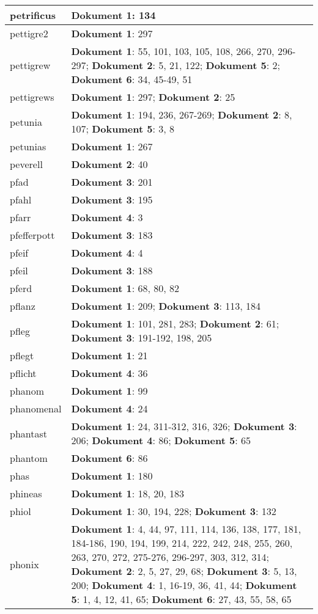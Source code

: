 \documentclass[a5paper]{article}
\begin{document}
\begin{longtable}[l]{|l|p{3in}|}
\hline
petrificus & \textbf{Dokument 1}: 134 \\
\hline
pettigre2 & \textbf{Dokument 1}: 297 \\
\hline
pettigrew & \textbf{Dokument 1}: 55, 101, 103, 105, 108, 266, 270, 296-297; \textbf{Dokument 2}: 5, 21, 122; \textbf{Dokument 5}: 2; \textbf{Dokument 6}: 34, 45-49, 51 \\
\hline
pettigrews & \textbf{Dokument 1}: 297; \textbf{Dokument 2}: 25 \\
\hline
petunia & \textbf{Dokument 1}: 194, 236, 267-269; \textbf{Dokument 2}: 8, 107; \textbf{Dokument 5}: 3, 8 \\
\hline
petunias & \textbf{Dokument 1}: 267 \\
\hline
peverell & \textbf{Dokument 2}: 40 \\
\hline
pfad & \textbf{Dokument 3}: 201 \\
\hline
pfahl & \textbf{Dokument 3}: 195 \\
\hline
pfarr & \textbf{Dokument 4}: 3 \\
\hline
pfefferpott & \textbf{Dokument 3}: 183 \\
\hline
pfeif & \textbf{Dokument 4}: 4 \\
\hline
pfeil & \textbf{Dokument 3}: 188 \\
\hline
pferd & \textbf{Dokument 1}: 68, 80, 82 \\
\hline
pflanz & \textbf{Dokument 1}: 209; \textbf{Dokument 3}: 113, 184 \\
\hline
pfleg & \textbf{Dokument 1}: 101, 281, 283; \textbf{Dokument 2}: 61; \textbf{Dokument 3}: 191-192, 198, 205 \\
\hline
pflegt & \textbf{Dokument 1}: 21 \\
\hline
pflicht & \textbf{Dokument 4}: 36 \\
\hline
phanom & \textbf{Dokument 1}: 99 \\
\hline
phanomenal & \textbf{Dokument 4}: 24 \\
\hline
phantast & \textbf{Dokument 1}: 24, 311-312, 316, 326; \textbf{Dokument 3}: 206; \textbf{Dokument 4}: 86; \textbf{Dokument 5}: 65 \\
\hline
phantom & \textbf{Dokument 6}: 86 \\
\hline
phas & \textbf{Dokument 1}: 180 \\
\hline
phineas & \textbf{Dokument 1}: 18, 20, 183 \\
\hline
phiol & \textbf{Dokument 1}: 30, 194, 228; \textbf{Dokument 3}: 132 \\
\hline
phonix & \textbf{Dokument 1}: 4, 44, 97, 111, 114, 136, 138, 177, 181, 184-186, 190, 194, 199, 214, 222, 242, 248, 255, 260, 263, 270, 272, 275-276, 296-297, 303, 312, 314; \textbf{Dokument 2}: 2, 5, 27, 29, 68; \textbf{Dokument 3}: 5, 13, 200; \textbf{Dokument 4}: 1, 16-19, 36, 41, 44; \textbf{Dokument 5}: 1, 4, 12, 41, 65; \textbf{Dokument 6}: 27, 43, 55, 58, 65 \\

\end{longtable}
\end{document}
